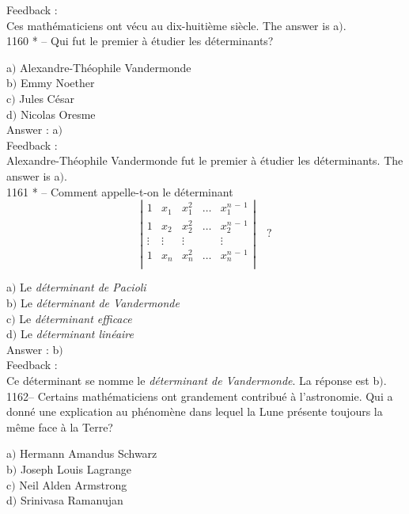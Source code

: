﻿\documentclass[letterpaper, 12pt]{article}
\begin{document}
Feedback : \\
Ces math\'ematiciens ont v\'ecu au dix-huiti\`eme si\`ecle. The answer is
a$)$.\\

1160 * -- Qui fut le premier \`a \'etudier les d\'eterminants?

a$)$ Alexandre-Th\'eophile Vandermonde \\
b$)$ Emmy Noether \\
c$)$ Jules C\'esar \\
d$)$ Nicolas Oresme   \\

Answer : a$)$\\

Feedback : \\
Alexandre-Th\'eophile Vandermonde fut le premier \`a \'etudier les
d\'eterminants. The answer is a$)$.\\

1161 * -- Comment appelle-t-on le d\'eterminant
$$\left|\begin{matrix}
1      & x_1 & x_1^2 & \ldots & x_1^{n\,-\,1} \\
1      & x_2 & x_2^2 & \ldots & x_2^{n\,-\,1} \\
\vdots &\vdots &\vdots &      & \vdots    \\
1      & x_n & x_n^2 & \ldots & x_n^{n\,-\,1} \\
\end{matrix}\right|\quad?$$

a$)$ Le {\sl d\'eterminant de Pacioli} \\
b$)$ Le {\sl d\'eterminant de Vandermonde} \\
c$)$ Le {\sl d\'eterminant efficace} \\
d$)$ Le {\sl d\'eterminant lin\'eaire}  \\

Answer : b$)$\\

Feedback : \\
Ce d\'eterminant se nomme le {\sl d\'eterminant de Vandermonde}. La
r\'eponse est b$)$.\\

1162-- Certains math\'ematiciens ont grandement contribu\'e \`a
l'astronomie. Qui a donn\'e une explication au ph\'enom\`ene dans
lequel la Lune pr\'esente toujours la m\^eme face \`a la Terre?

a$)$ Hermann Amandus Schwarz \\
b$)$ Joseph Louis Lagrange \\
c$)$ Neil Alden Armstrong \\
d$)$ Srinivasa Ramanujan\\
\end{document}
